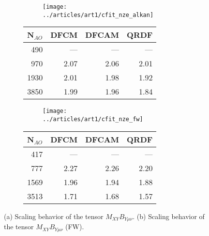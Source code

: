 %
\begin{figure}[htp]

\begin{subfigure}{\textwidth}
\begin{subfigure}{0.45\textwidth}
\texttt{[image: ../articles/art1/cfit\_nze\_alkan]}
\end{subfigure}
\hfill
\begin{subtable}{0.45\textwidth}
\begin{tabular}{rrrr}
\hline
N$_{AO}$ & DFCM & DFCAM & QRDF \\ \hline
490 & --- & --- & --- \\ 
970 & 2.07 & 2.06 & 2.01 \\ 
1930 & 2.01 & 1.98 & 1.92 \\ 
3850 & 1.99 & 1.96 & 1.84 \\ \hline
\end{tabular}
\end{subtable}
\caption{}
\label{fig:GS_MBNZE_LA}
\end{subfigure}

\vspace{1.5\baselineskip}

\begin{subfigure}{\textwidth}
\begin{subfigure}{0.45\textwidth}
\texttt{[image: ../articles/art1/cfit\_nze\_fw]}
\end{subfigure}
\hfill
\begin{subtable}{0.45\textwidth}
\begin{tabular}{rrrr}
\hline
N$_{AO}$ & DFCM & DFCAM & QRDF \\ \hline
417 & --- & --- & --- \\ 
777 & 2.27 & 2.26 & 2.20 \\ 
1569 & 1.96 & 1.94 & 1.88 \\ 
3513 & 1.71 & 1.68 & 1.57 \\ \hline
\end{tabular}
\end{subtable}
\caption{}
\label{fig:GS_MBNZE_FW}
\end{subfigure}
%

\caption{(a) Scaling behavior of the tensor $M_{XY}B_{Y\mu\nu}$. (b) Scaling behavior of the tensor $M_{XY}B_{Y\mu\nu}$ (FW).}

\end{figure}